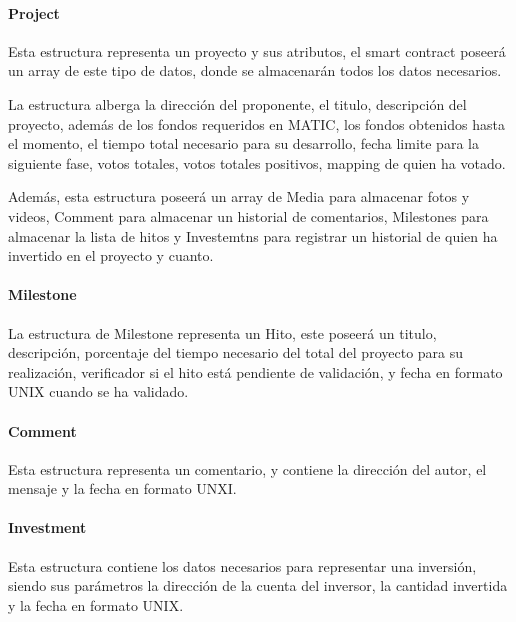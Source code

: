\newpage

\paragraph{Project}

Esta estructura representa un proyecto y sus atributos, el smart contract poseerá un array de este tipo de datos, donde se almacenarán todos los datos necesarios.

\bigskip

La estructura alberga la dirección del proponente, el titulo, descripción del proyecto, además de los fondos requeridos en MATIC, los fondos obtenidos hasta el momento, el tiempo total necesario para su desarrollo, fecha limite para la siguiente fase, votos totales, votos totales positivos, mapping de quien ha votado.

\bigskip

Además, esta estructura poseerá un array de Media para almacenar fotos y videos, Comment para almacenar un historial de comentarios, Milestones para almacenar la lista de hitos y Investemtns para registrar un historial de quien ha invertido en el proyecto y cuanto.

\paragraph{Milestone}

La estructura de Milestone representa un Hito, este poseerá un titulo, descripción, porcentaje del tiempo necesario del total del proyecto para su realización, verificador si el hito está pendiente de validación, y fecha en formato UNIX cuando se ha validado.

\paragraph{Comment}

Esta estructura representa un comentario, y contiene la dirección del autor, el mensaje y la fecha en formato UNXI.

\paragraph{Investment}

Esta estructura contiene los datos necesarios para representar una inversión, siendo sus parámetros la dirección de la cuenta del inversor, la cantidad invertida y la fecha en formato UNIX.

